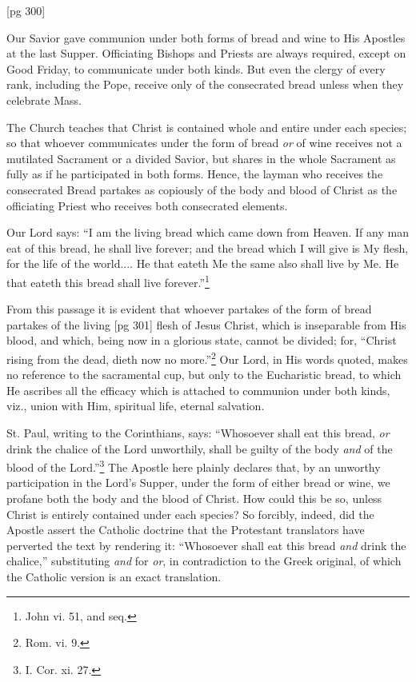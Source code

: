 [pg 300]


Our Savior gave communion under both
forms of bread and wine to His Apostles
at the last Supper. Officiating Bishops and
Priests are always required, except on Good Friday,
to communicate under both kinds. But even
the clergy of every rank, including the Pope, receive
only of the consecrated bread unless when
they celebrate Mass.

The Church teaches that Christ is contained
whole and entire under each species; so that whoever
communicates under the form of bread \emph{or} of
wine receives not a mutilated Sacrament or a
divided Savior, but shares in the whole Sacrament
as fully as if he participated in both forms.
Hence, the layman who receives the consecrated
Bread partakes as copiously of the body and blood
of Christ as the officiating Priest who receives
both consecrated elements.

Our Lord says: “I am the living bread which
came down from Heaven. If any man eat of this
bread, he shall live forever; and the bread which I
will give is My flesh, for the life of the world....
He that eateth Me the same also shall live by Me.
He that eateth this bread shall live forever.”\footnote{John
vi. 51, and seq.}

From this passage it is evident that whoever
partakes of the form of bread partakes of the living
[pg 301]
flesh of Jesus Christ, which is inseparable from
His blood, and which, being now in a glorious
state, cannot be divided; for, “Christ rising from
the dead, dieth now no more.”\footnote{Rom.
vi. 9.} Our Lord, in His
words quoted, makes no reference to the sacramental
cup, but only to the Eucharistic bread, to
which He ascribes all the efficacy which is attached
to communion under both kinds, viz., union with
Him, spiritual life, eternal salvation.

St. Paul, writing to the Corinthians, says:
“Whosoever shall eat this bread, \emph{or} drink the
chalice of the Lord unworthily, shall be guilty of
the body \emph{and} of the blood of the Lord.”\footnote{I.
Cor. xi. 27.} The
Apostle here plainly declares that, by an unworthy
participation in the Lord's Supper, under the
form of either bread or wine, we profane both the
body and the blood of Christ. How could this be
so, unless Christ is entirely contained under each
species? So forcibly, indeed, did the Apostle assert
the Catholic doctrine that the Protestant
translators have perverted the text by rendering
it: “Whosoever shall eat this bread \emph{and} drink the
chalice,” substituting \emph{and} for \emph{or}, in contradiction
to the Greek original, of which the Catholic version
is an exact translation.

